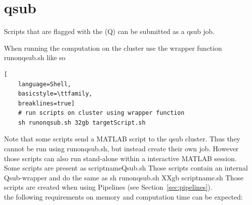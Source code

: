 \documentclass[12pt,a4paper]{scrartcl}
\begin{document}
\section{qsub}
Scripts that are flagged with the (Q) can be submitted as a qsub job.

\noindent When running the computation on the cluster use the wrapper function runonqsub.sh like so
\begin{lstlisting}[
    language=Shell,
    basicstyle=\ttfamily,
    breaklines=true]
    # run scripts on cluster using wrapper function
    sh runonqsub.sh 32gb targetScript.sh
\end{lstlisting}


\noindent Note that some scripts send a MATLAB script to the qsub cluster. Thus they cannot be run using runonqsub.sh, but instead create their own job. However those scripts can also run stand-alone within a interactive MATLAB session.\\

\noindent Some scripts are present as scriptnameQsub.sh Those scripts contain an internal Qsub-wrapper and do the same as sh runonqsub.sh XXgb scriptname.sh Those scripts are created when using Pipelines (see Section~\ref{sec:pipelines}).\\

\noindent the following requirements on memory and computation time can be expected:
\end{document}
